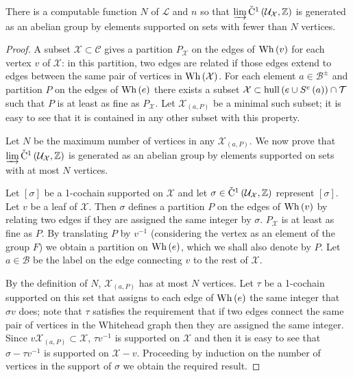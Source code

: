 \begin{thm}\label{thm:generators1} There is a computable function $N$ of
$\mathcal{L}$ and $n$ so that $\varinjlim \check{\mathrm{C}}{}^1\left(
\mathcal{U}_\mathcal{X}, \mathbb{Z} \right)$ is generated as an abelian group
by elements supported on sets with fewer than $N$ vertices. \end{thm}

\begin{proof} A subset $\mathcal{X} \subset \mathcal{C}$ gives a partition
$P_\mathcal{X}$ on the edges of $\mathrm{Wh}\left(v\right)$ for each vertex $v$ of
$\mathcal{X}$: in this partition, two edges are related if those edges extend
to edges between the same pair of vertices in $\mathrm{Wh}\left(\mathcal{X}\right)$. For each
element $a \in \mathcal{B}^{\pm}$ and partition $P$ on the edges of
$\mathrm{Wh}\left(e\right)$ there exists a subset $\mathcal{X} \subset \operatorname{\mathrm{hull}}\left(e \cup
S^e\left(a\right)\right) \cap \mathcal{T}$ such that $P$ is at
least as fine as $P_\mathcal{X}$. Let $\mathcal{X}_{\left(a, P\right)}$ be
a minimal such subset; it is easy to see that it is contained in any other
subset with this property. 

Let $N$ be the maximum number of vertices in any $\mathcal{X}_{\left(a,
P\right)}$. We now prove that $\varinjlim \check{\mathrm{C}}{}^1\left(
\mathcal{U}_\mathcal{X}, \mathbb{Z}\right)$ is generated as an abelian group
by elements supported on sets with at most $N$ vertices.

Let $\left[\sigma\right]$ be a 1-cochain supported on $\mathcal{X}$ and let
$\sigma \in \check{\mathrm{C}}^1\left(\mathcal{U}_\mathcal{X}, \mathbb{Z}\right) $ represent
$\left[\sigma\right]$. Let $v$ be a leaf of $\mathcal{X}$. Then
$\sigma$ defines a partition $P$ on the edges of $\mathrm{Wh}\left(v\right)$ by relating two
edges if they are assigned the same integer by $\sigma$.  $P_\mathcal{X}$
is at least as fine as $P$. By translating $P$ by $v^{-1}$ (considering
the vertex as an element of the group $F$) we obtain a partition on
$\mathrm{Wh}\left(e\right)$, which we shall also denote by $P$.  Let $a \in \mathcal{B}$ be
the label on the edge connecting $v$ to the rest of $\mathcal{X}$.

By the definition of $N$, $\mathcal{X}_{\left(a, P\right)}$ has at most
$N$ vertices. Let $\tau$ be a 1-cochain supported on this set that assigns
to each edge of $\mathrm{Wh}\left(e\right)$ the same integer that $\sigma v$ does; note that
$\tau$ satisfies the requirement that if two edges connect the same pair of
vertices in the Whitehead graph then they are assigned the same integer. Since
$v\mathcal{X}_{\left(a, P\right)} \subset \mathcal{X}$, $\tau v^{-1}$ is
supported on $\mathcal{X}$ and then it is easy to see that $\sigma - \tau
v^{-1}$ is supported on $\mathcal{X} - v$. Proceeding by induction on the
number of vertices in the support of $\sigma$ we obtain the required
result.\end{proof}

